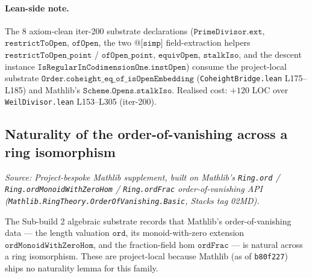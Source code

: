 \paragraph{Lean-side note.} The 8 axiom-clean iter-200 substrate
declarations
(\(\texttt{PrimeDivisor.ext}\), \(\texttt{restrictToOpen}\),
\(\texttt{ofOpen}\), the two \(\texttt{@[simp]}\) field-extraction
helpers \(\texttt{restrictToOpen\_point}\) /
\(\texttt{ofOpen\_point}\), \(\texttt{equivOpen}\),
\(\texttt{stalkIso}\), and the descent instance
\(\texttt{IsRegularInCodimensionOne.instOpen}\)) consume the project-local
substrate \(\texttt{Order.coheight\_eq\_of\_isOpenEmbedding}\)
(\texttt{CoheightBridge.lean} L175--L185) and Mathlib's
\(\texttt{Scheme.Opens.stalkIso}\). Realised cost: \(+120\) LOC over
\texttt{WeilDivisor.lean} L153--L305 (iter-200).

\subsection{Naturality of the order-of-vanishing across a ring isomorphism}
\label{subsec:ordFrac_ringEquiv}
\textit{Source: Project-bespoke Mathlib supplement, built on Mathlib's
\texttt{Ring.ord} / \texttt{Ring.ordMonoidWithZeroHom} / \texttt{Ring.ordFrac}
order-of-vanishing API (\texttt{Mathlib.RingTheory.OrderOfVanishing.Basic},
Stacks tag 02MD).}

The Sub-build 2 algebraic substrate records that Mathlib's order-of-vanishing
data --- the length valuation \(\texttt{ord}\), its monoid-with-zero extension
\(\texttt{ordMonoidWithZeroHom}\), and the fraction-field hom
\(\texttt{ordFrac}\) --- is natural across a ring isomorphism. These are
project-local because Mathlib (as of \texttt{b80f227}) ships no naturality
lemma for this family.

